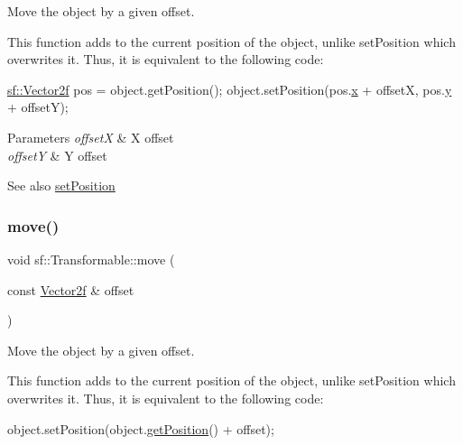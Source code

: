 Move the object by a given offset. 

This function adds to the current position of the object, unlike set\+Position which overwrites it. Thus, it is equivalent to the following code\+: 
\begin{DoxyCode}
\hyperlink{classsf_1_1_vector2}{sf::Vector2f} pos = \textcolor{keywordtype}{object}.getPosition();
\textcolor{keywordtype}{object}.setPosition(pos.\hyperlink{classsf_1_1_vector2_a1e6ad77fa155f3753bfb92699bd28141}{x} + offsetX, pos.\hyperlink{classsf_1_1_vector2_a420f2481b015f4eb929c75f2af564299}{y} + offsetY);
\end{DoxyCode}



\begin{DoxyParams}{Parameters}
{\em offsetX} & X offset \\
\hline
{\em offsetY} & Y offset\\
\hline
\end{DoxyParams}
\begin{DoxySeeAlso}{See also}
\hyperlink{classsf_1_1_transformable_a4dbfb1a7c80688b0b4c477d706550208}{set\+Position} 
\end{DoxySeeAlso}
\mbox{\label{classsf_1_1_transformable_ab9ca691522f6ddc1a40406849b87c469}} 
\subsubsection{\texorpdfstring{move()}{move()}\hspace{0.1cm}{\footnotesize\ttfamily [2/2]}}
{\footnotesize\ttfamily void sf\+::\+Transformable\+::move (\begin{DoxyParamCaption}\item[{const \hyperlink{classsf_1_1_vector2}{Vector2f} \&}]{offset }\end{DoxyParamCaption})}



Move the object by a given offset. 

This function adds to the current position of the object, unlike set\+Position which overwrites it. Thus, it is equivalent to the following code\+: 
\begin{DoxyCode}
\textcolor{keywordtype}{object}.setPosition(\textcolor{keywordtype}{object}.\hyperlink{classsf_1_1_transformable_a73f9739bc6e74db2cea154bc8e94ec46}{getPosition}() + offset);
\end{DoxyCode}



